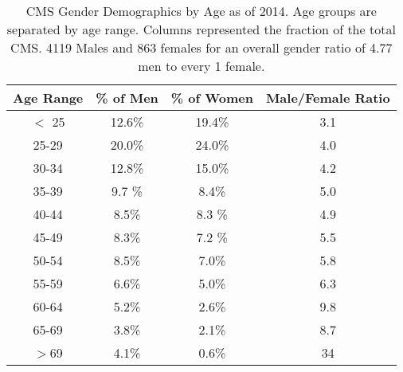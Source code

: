 \begin{center}
\begin{table}[]
\begin{center}
\caption{CMS Gender Demographics by Age as of 2014. Age groups are separated by age range. Columns represented the fraction of the total CMS. 4119 Males and 863 females for an overall gender ratio of 4.77 men to every 1 female.}
\begin{tabular}{cccc}
\textbf{Age Range} & \textbf{\% of Men} & \textbf{\% of Women} & \textbf{Male/Female Ratio}\\
\hline
$<$ 25 & 12.6\% & 19.4\% & 3.1  \\
25-29 & 20.0\% & 24.0\% & 4.0  \\
30-34 & 12.8\% & 15.0\% & 4.2  \\
35-39 & 9.7 \% & 8.4\%  & 5.0  \\
40-44 & 8.5\%  & 8.3 \% & 4.9  \\
45-49 & 8.3\%  & 7.2 \% & 5.5  \\
50-54 & 8.5\%  & 7.0\%  & 5.8  \\
55-59 & 6.6\%  & 5.0\%  & 6.3  \\
60-64 & 5.2\%  & 2.6\%  & 9.8  \\ 
65-69 & 3.8\%  & 2.1\%  & 8.7  \\
$>$69  & 4.1\%  & 0.6\%  & 34 \\ 
\end{tabular}
\end{center}
\end{table}
\end{center}
